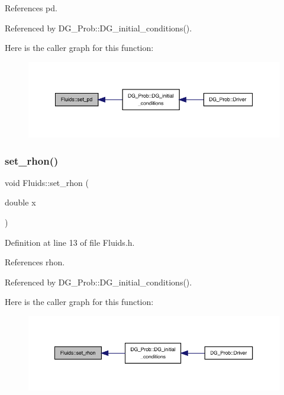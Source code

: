 References pd.



Referenced by D\+G\+\_\+\+Prob\+::\+D\+G\+\_\+initial\+\_\+conditions().

Here is the caller graph for this function\+:
\nopagebreak
\begin{figure}[H]
\begin{center}
\leavevmode
\includegraphics[width=350pt]{classFluids_ac0bfd221bb7f40b21eeb4c20f4e68017_icgraph}
\end{center}
\end{figure}
\mbox{\label{classFluids_a5284e84fd9cc680c0cb17ccf72cdc722}} 
\subsubsection{\texorpdfstring{set\+\_\+rhon()}{set\_rhon()}}
{\footnotesize\ttfamily void Fluids\+::set\+\_\+rhon (\begin{DoxyParamCaption}\item[{double}]{x }\end{DoxyParamCaption})\hspace{0.3cm}{\ttfamily [inline]}}



Definition at line 13 of file Fluids.\+h.



References rhon.



Referenced by D\+G\+\_\+\+Prob\+::\+D\+G\+\_\+initial\+\_\+conditions().

Here is the caller graph for this function\+:
\nopagebreak
\begin{figure}[H]
\begin{center}
\leavevmode
\includegraphics[width=350pt]{classFluids_a5284e84fd9cc680c0cb17ccf72cdc722_icgraph}
\end{center}
\end{figure}
\mbox{\label{classFluids_a5e905062ca17feb08fa1afc89efe042d}} 
